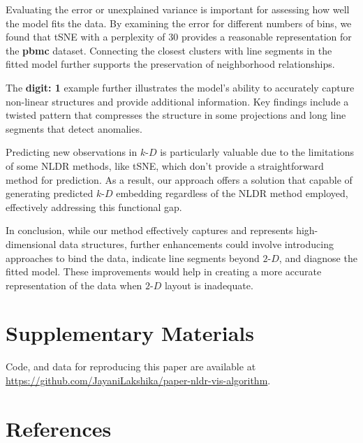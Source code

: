 \documentclass[
  12pt]{article}
\newcommand\kD{$k\text{-}D$}
\newcommand\gD{$2\text{-}D$}
\begin{document}
Evaluating the error or unexplained variance is important for assessing
how well the model fits the data. By examining the error for different
numbers of bins, we found that tSNE with a perplexity of \(30\) provides
a reasonable representation for the \textbf{pbmc} dataset. Connecting
the closest clusters with line segments in the fitted model further
supports the preservation of neighborhood relationships.

The \textbf{digit: 1} example further illustrates the model's ability to
accurately capture non-linear structures and provide additional
information. Key findings include a twisted pattern that compresses the
structure in some projections and long line segments that detect
anomalies.

Predicting new observations in \kD{} is particularly valuable due to the
limitations of some NLDR methods, like tSNE, which don't provide a
straightforward method for prediction. As a result, our approach offers
a solution that capable of generating predicted \kD{} embedding
regardless of the NLDR method employed, effectively addressing this
functional gap.

In conclusion, while our method effectively captures and represents
high-dimensional data structures, further enhancements could involve
introducing approaches to bind the data, indicate line segments beyond
\gD{}, and diagnose the fitted model. These improvements would help in
creating a more accurate representation of the data when \gD{} layout is
inadequate.

\section{Supplementary Materials}\label{supplementary-materials}

Code, and data for reproducing this paper are available at
\url{https://github.com/JayaniLakshika/paper-nldr-vis-algorithm}.

\section*{References}\label{references}

\renewcommand{\bibsection}{}


\newpage{}
\end{document}
